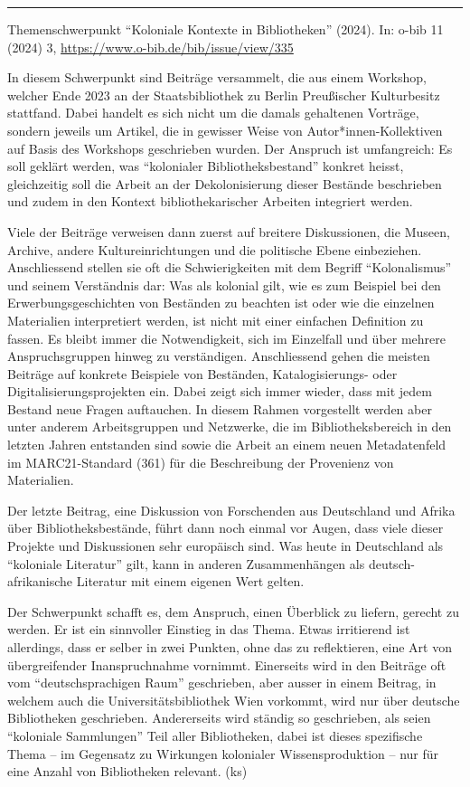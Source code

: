 \documentclass[a4paper,
fontsize=11pt,
oneside,
numbers=noperiodatend,
parskip=half-,
bibliography=totoc,
final
]{scrartcl}
\begin{document}
\begin{center}\rule{0.5\linewidth}{0.5pt}\end{center}

Themenschwerpunkt \enquote{Koloniale Kontexte in Bibliotheken} (2024).
In: o-bib 11 (2024) 3, \url{https://www.o-bib.de/bib/issue/view/335}

In diesem Schwerpunkt sind Beiträge versammelt, die aus einem Workshop,
welcher Ende 2023 an der Staatsbibliothek zu Berlin Preußischer
Kulturbesitz stattfand. Dabei handelt es sich nicht um die damals
gehaltenen Vorträge, sondern jeweils um Artikel, die in gewisser Weise
von Autor*innen-Kollektiven auf Basis des Workshops geschrieben wurden.
Der Anspruch ist umfangreich: Es soll geklärt werden, was
\enquote{kolonialer Bibliotheksbestand} konkret heisst, gleichzeitig
soll die Arbeit an der Dekolonisierung dieser Bestände beschrieben und
zudem in den Kontext bibliothekarischer Arbeiten integriert werden.

Viele der Beiträge verweisen dann zuerst auf breitere Diskussionen, die
Museen, Archive, andere Kultureinrichtungen und die politische Ebene
einbeziehen. Anschliessend stellen sie oft die Schwierigkeiten mit dem
Begriff \enquote{Kolonalismus} und seinem Verständnis dar: Was als
kolonial gilt, wie es zum Beispiel bei den Erwerbungsgeschichten von
Beständen zu beachten ist oder wie die einzelnen Materialien
interpretiert werden, ist nicht mit einer einfachen Definition zu
fassen. Es bleibt immer die Notwendigkeit, sich im Einzelfall und über
mehrere Anspruchsgruppen hinweg zu verständigen. Anschliessend gehen die
meisten Beiträge auf konkrete Beispiele von Beständen, Katalogisierungs-
oder Digitalisierungsprojekten ein. Dabei zeigt sich immer wieder, dass
mit jedem Bestand neue Fragen auftauchen. In diesem Rahmen vorgestellt
werden aber unter anderem Arbeitsgruppen und Netzwerke, die im
Bibliotheksbereich in den letzten Jahren entstanden sind sowie die
Arbeit an einem neuen Metadatenfeld im MARC21-Standard (361) für die
Beschreibung der Provenienz von Materialien.

Der letzte Beitrag, eine Diskussion von Forschenden aus Deutschland und
Afrika über Bibliotheksbestände, führt dann noch einmal vor Augen, dass
viele dieser Projekte und Diskussionen sehr europäisch sind. Was heute
in Deutschland als \enquote{koloniale Literatur} gilt, kann in anderen
Zusammenhängen als deutsch-afrikanische Literatur mit einem eigenen Wert
gelten.

Der Schwerpunkt schafft es, dem Anspruch, einen Überblick zu liefern,
gerecht zu werden. Er ist ein sinnvoller Einstieg in das Thema. Etwas
irritierend ist allerdings, dass er selber in zwei Punkten, ohne das zu
reflektieren, eine Art von übergreifender Inanspruchnahme vornimmt.
Einerseits wird in den Beiträge oft vom \enquote{deutschsprachigen Raum}
geschrieben, aber ausser in einem Beitrag, in welchem auch die
Universitätsbibliothek Wien vorkommt, wird nur über deutsche
Bibliotheken geschrieben. Andererseits wird ständig so geschrieben, als
seien \enquote{koloniale Sammlungen} Teil aller Bibliotheken, dabei ist
dieses spezifische Thema – im Gegensatz zu Wirkungen kolonialer
Wissensproduktion – nur für eine Anzahl von Bibliotheken relevant. (ks)
\end{document}
